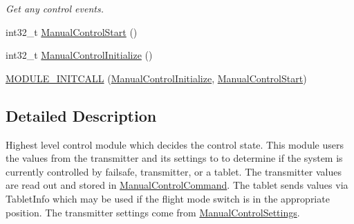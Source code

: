 \begin{DoxyCompactItemize}
\begin{DoxyCompactList}\small\item\em \-Get any control events. \end{DoxyCompactList}\item 
int32\-\_\-t \hyperlink{group___control_ga6898605c577e556c14f9f296ce99d58a}{\-Manual\-Control\-Start} ()
\item 
int32\-\_\-t \hyperlink{group___control_gab34729c98a8d9f36a6064c9148941005}{\-Manual\-Control\-Initialize} ()
\item 
\hyperlink{group___control_ga4a3722cc695788ccfc0e15d467e8f5a1}{\-M\-O\-D\-U\-L\-E\-\_\-\-I\-N\-I\-T\-C\-A\-L\-L} (\hyperlink{group___control_gab34729c98a8d9f36a6064c9148941005}{\-Manual\-Control\-Initialize}, \hyperlink{group___control_ga6898605c577e556c14f9f296ce99d58a}{\-Manual\-Control\-Start})
\end{DoxyCompactItemize}


\subsection{\-Detailed \-Description}
\-Highest level control module which decides the control state. \-This module users the values from the transmitter and its settings to to determine if the system is currently controlled by failsafe, transmitter, or a tablet. \-The transmitter values are read out and stored in \hyperlink{group___manual_control_command}{\-Manual\-Control\-Command}. \-The tablet sends values via \-Tablet\-Info which may be used if the flight mode switch is in the appropriate position. \-The transmitter settings come from \hyperlink{group___manual_control_settings}{\-Manual\-Control\-Settings}. 

